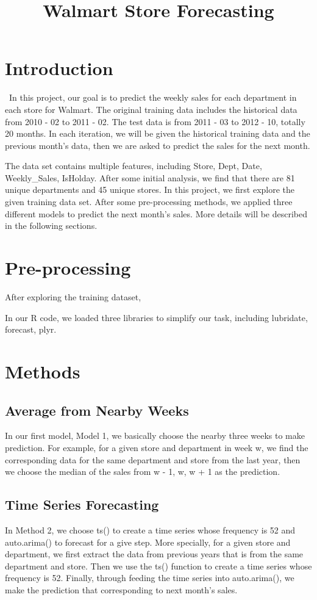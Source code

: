 \documentclass[12pt]{article}
\title{Walmart Store Forecasting}
\begin{document}
%
\maketitle

\section{Introduction}
\quad\ In this project, our goal is to predict the weekly sales for each department in each store for Walmart. The original training data includes the historical data from 2010 - 02 to 2011 - 02.  The test data is from 2011 - 03 to 2012 - 10, totally 20 months. In each iteration, we will be given the historical training data and the previous month's data, then we are asked to predict the sales for the next month.

The data set contains multiple features, including Store, Dept, Date, Weekly\_Sales, IsHolday. After some initial analysis, we find that there are 81 unique departments and 45 unique stores. In this project, we first explore the given training data set. After some pre-processing methods, we applied three different models to predict the next month's sales. More details will be described in the following sections.

\section{Pre-processing}
After exploring the training dataset, 

In our R code, we loaded three libraries to simplify our task, including lubridate, forecast, plyr.


\section{Methods}

\subsection{Average from Nearby Weeks}
In our first model, Model 1, we basically choose the nearby three weeks to make prediction. For example, for a given store and department in week w, we find the corresponding data for the same department and store from the last year, then we choose the median of the sales from w - 1, w, w + 1 as the prediction.

\subsection{Time Series Forecasting}
In Method 2, we choose ts() to create a time series whose frequency is 52 and auto.arima() to forecast for a give step. More specially, for a given store and department, we first extract the data from previous years that is from the same department and store. Then we use the ts() function to create a time series whose frequency is 52. Finally, through feeding the time series into auto.arima(), we make the prediction that corresponding to next month's sales.
\end{document}
